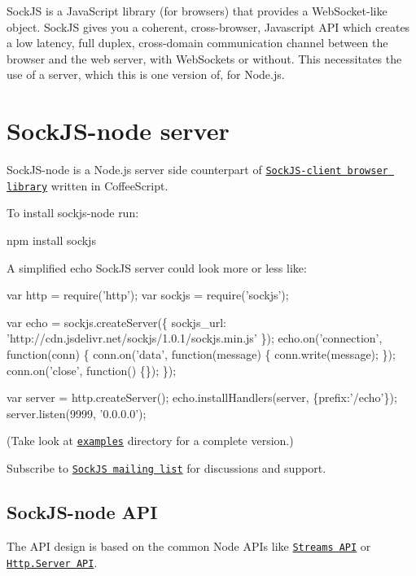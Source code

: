 Sock\+JS is a Java\+Script library (for browsers) that provides a Web\+Socket-\/like object. Sock\+JS gives you a coherent, cross-\/browser, Javascript A\+PI which creates a low latency, full duplex, cross-\/domain communication channel between the browser and the web server, with Web\+Sockets or without. This necessitates the use of a server, which this is one version of, for Node.\+js.

\section*{Sock\+J\+S-\/node server }

Sock\+J\+S-\/node is a Node.\+js server side counterpart of \href{https://github.com/sockjs/sockjs-client}{\tt Sock\+J\+S-\/client browser library} written in Coffee\+Script.

To install {\ttfamily sockjs-\/node} run\+: \begin{DoxyVerb}npm install sockjs
\end{DoxyVerb}


A simplified echo Sock\+JS server could look more or less like\+:


\begin{DoxyCode}
var http = require('http');
var sockjs = require('sockjs');

var echo = sockjs.createServer(\{ sockjs\_url: 'http://cdn.jsdelivr.net/sockjs/1.0.1/sockjs.min.js' \});
echo.on('connection', function(conn) \{
    conn.on('data', function(message) \{
        conn.write(message);
    \});
    conn.on('close', function() \{\});
\});

var server = http.createServer();
echo.installHandlers(server, \{prefix:'/echo'\});
server.listen(9999, '0.0.0.0');
\end{DoxyCode}


(Take look at \href{https://github.com/sockjs/sockjs-node/tree/master/examples/echo}{\tt examples} directory for a complete version.)

Subscribe to \href{https://groups.google.com/forum/#!forum/sockjs}{\tt Sock\+JS mailing list} for discussions and support.

\subsection*{Sock\+J\+S-\/node A\+PI }

The A\+PI design is based on the common Node A\+PI\textquotesingle{}s like \href{http://nodejs.org/docs/v0.5.8/api/streams.html}{\tt Streams A\+PI} or \href{http://nodejs.org/docs/v0.5.8/api/http.html#http.Server}{\tt Http.\+Server A\+PI}.

